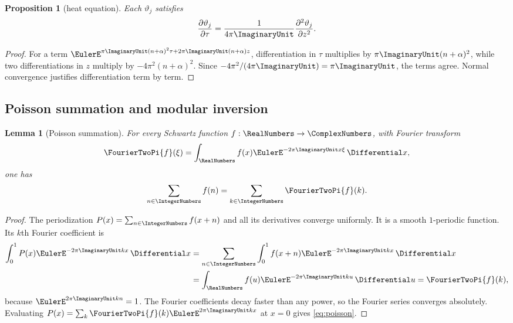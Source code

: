 \documentclass[11pt,oneside]{article}
\newtheorem{proposition}[theorem]{Proposition}
\newtheorem{lemma}[theorem]{Lemma}
\theoremstyle{definition}
\begin{document}
\begin{proposition}[heat equation]\label{prop:theta-heat}
Each $\vartheta_j$ satisfies
\begin{equation}\label{eq:heat-equation}
 \frac{\partial\vartheta_j}{\partial\tau}
 =\frac{1}{4\pi\ImaginaryUnit}\frac{\partial^2\vartheta_j}{\partial z^2}.
\end{equation}
\end{proposition}

\begin{proof}
For a term $\EulerE^{\pi\ImaginaryUnit(n+\alpha)^2\tau+2\pi\ImaginaryUnit(n+\alpha)z}$,
differentiation in $\tau$ multiplies by $\pi\ImaginaryUnit(n+\alpha)^2$, while
two differentiations in $z$ multiply by $-4\pi^2(n+\alpha)^2$.
Since $-4\pi^2/(4\pi\ImaginaryUnit)=\pi\ImaginaryUnit$, the terms agree. Normal convergence
justifies differentiation term by term.
\end{proof}

\subsection{Poisson summation and modular inversion}

\begin{lemma}[Poisson summation]\label{lem:poisson}
For every Schwartz function $f:\RealNumbers\to\ComplexNumbers$, with Fourier transform
\[
\FourierTwoPi{f}(\xi)=\int_{\RealNumbers}f(x)\EulerE^{-2\pi\ImaginaryUnit x\xi}\,\Differential x,
\]
one has
\begin{equation}\label{eq:poisson}
\sum_{n\in\IntegerNumbers}f(n)=\sum_{k\in\IntegerNumbers}\FourierTwoPi{f}(k).
\end{equation}
\end{lemma}

\begin{proof}
The periodization $P(x)=\sum_{n\in\IntegerNumbers}f(x+n)$ and all its derivatives
converge uniformly. It is a smooth $1$-periodic function. Its $k$th
Fourier coefficient is
\begin{align*}
 \int_0^1P(x)\EulerE^{-2\pi\ImaginaryUnit kx}\,\Differential x
 &=\sum_{n\in\IntegerNumbers}\int_0^1f(x+n)\EulerE^{-2\pi\ImaginaryUnit kx}\,\Differential x\\
 &=\int_\RealNumbers f(u)\EulerE^{-2\pi\ImaginaryUnit ku}\,\Differential u
=\FourierTwoPi{f}(k),
\end{align*}
because $\EulerE^{2\pi\ImaginaryUnit kn}=1$. The Fourier coefficients decay faster
than any power, so the Fourier series converges absolutely. Evaluating
$P(x)=\sum_k\FourierTwoPi{f}(k)\EulerE^{2\pi\ImaginaryUnit kx}$ at $x=0$ gives
\eqref{eq:poisson}.
\end{proof}
\end{document}
